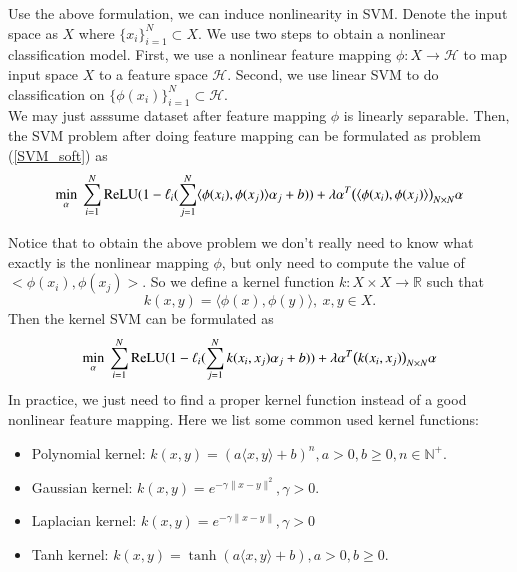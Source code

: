 Use the above formulation, we can induce nonlinearity in SVM. Denote the input space as $X$ where $\{x_i\}_{i=1}^N \subset X$. We use two steps to obtain a nonlinear classification model. First, we use a nonlinear feature mapping $\phi: X\rightarrow \mathcal{H}$ to map input space $X$ to a feature space $\mathcal{H}$. Second, we use linear SVM to do classification on $\{\phi(x_i)\}_{i=1}^N\subset \mathcal{H}$.\\

We may just asssume dataset after feature mapping $\phi$ is linearly separable. Then, the SVM problem after doing feature mapping can be formulated as
problem (\ref{SVM_soft}) as 
\begin{equation}
\min_{\alpha}\ \sum_{i = 1}^N {\rm ReLU}(1-\ell_i(\sum_{j = 1}^N \langle \phi(x_i),\phi(x_j)\rangle \alpha_j+b)) + \lambda\alpha^T \big(\langle \phi(x_i),\phi(x_j)\rangle\big)_{N\times N} \alpha\\
\end{equation}

Notice that to obtain the above problem we don't really need to know what exactly is the nonlinear mapping $\phi$, but only need to compute the value of $<\phi(x_i),\phi(x_j)>$. So we define a kernel function $k: X\times X\rightarrow \mathbb{R}$ such that 
\begin{equation}
	k(x,y) = \langle\phi(x),\phi(y)\rangle,\ x,y\in X.
\end{equation}
Then the kernel SVM can be formulated as
\begin{equation}
\min_{\alpha}\ \sum_{i = 1}^N {\rm ReLU}(1-\ell_i(\sum_{j = 1}^N  k(x_i,x_j) \alpha_j+b)) + \lambda\alpha^T \big(k(x_i,x_j)\big)_{N\times N} \alpha\\
\end{equation}
In practice, we just need to find a proper kernel function instead of a good nonlinear feature mapping. Here we list some common used kernel functions:
\begin{itemize}
	\item Polynomial kernel: $k(x,y) = (a\langle x,y\rangle+ b)^n, a > 0, b\geq 0, n\in \mathbb{N}^+$.
	\item Gaussian kernel: $k(x,y) = e^{-\gamma\|x-y\|^2}, \gamma > 0$.
	\item Laplacian kernel: $k(x,y) = e^{-\gamma\|x-y\|}, \gamma > 0$
	\item Tanh kernel: $k(x,y) = \tanh(a\langle x,y\rangle+b), a>0, b\geq 0.$
\end{itemize}

